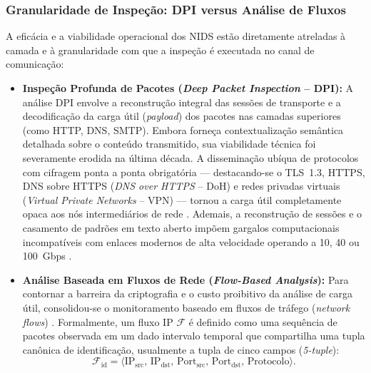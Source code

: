 \subsubsection{Granularidade de Inspeção: DPI versus Análise de Fluxos}

A eficácia e a viabilidade operacional dos NIDS estão diretamente atreladas à camada e à granularidade com que a inspeção é executada no canal de comunicação:

\begin{itemize}
    \item \textbf{Inspeção Profunda de Pacotes (\emph{Deep Packet Inspection} -- DPI):}
    A análise DPI envolve a reconstrução integral das sessões de transporte e a decodificação da carga útil (\emph{payload}) dos pacotes nas camadas superiores (como HTTP, DNS, SMTP). Embora forneça contextualização semântica detalhada sobre o conteúdo transmitido, sua viabilidade técnica foi severamente erodida na última década. A disseminação ubíqua de protocolos com cifragem ponta a ponta obrigatória — destacando-se o TLS~1.3, HTTPS, DNS sobre HTTPS (\emph{DNS over HTTPS} -- DoH) e redes privadas virtuais (\emph{Virtual Private Networks} -- VPN) — tornou a carga útil completamente opaca aos nós intermediários de rede \cite{standard2021, trafficmoe2026}. Ademais, a reconstrução de sessões e o casamento de padrões em texto aberto impõem gargalos computacionais incompatíveis com enlaces modernos de alta velocidade operando a 10, 40 ou 100~Gbps \cite{p4nids2025}.

    \item \textbf{Análise Baseada em Fluxos de Rede (\emph{Flow-Based Analysis}):}
    Para contornar a barreira da criptografia e o custo proibitivo da análise de carga útil, consolidou-se o monitoramento baseado em fluxos de tráfego (\emph{network flows}) \cite{netflow2020, AOUINI2022108719}. Formalmente, um fluxo IP $\mathcal{F}$ é definido como uma sequência de pacotes observada em um dado intervalo temporal que compartilha uma tupla canônica de identificação, usualmente a tupla de cinco campos (\emph{5-tuple}):
    \begin{equation}
    \label{eq:5tuple}
    \mathcal{F}_{\mathrm{id}} = \langle \mathrm{IP}_{\mathrm{src}}, \, \mathrm{IP}_{\mathrm{dst}}, \, \mathrm{Port}_{\mathrm{src}}, \, \mathrm{Port}_{\mathrm{dst}}, \, \mathrm{Protocolo} \rangle.
    \end{equation}
    

\end{itemize}

